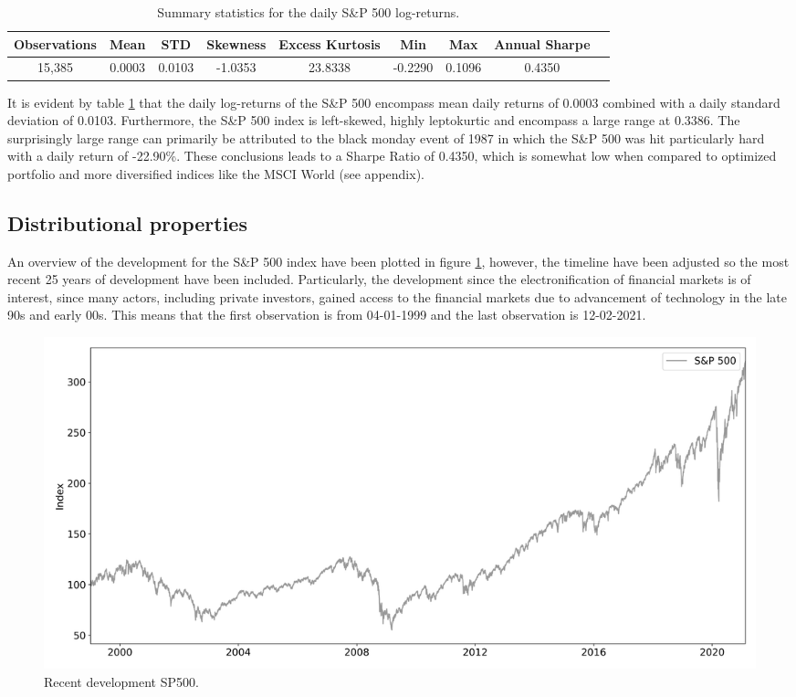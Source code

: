 \begin{table}[H]
\small
\caption{Summary statistics for the daily S\&P 500 log-returns.}
\centering
\begin{tabular}{c c c c c c c c c} 
\hline\hline
Observations & Mean & STD & Skewness & Excess Kurtosis & Min & Max & Annual Sharpe \\
\hline
15,385 & 0.0003 & 0.0103 & -1.0353 & 23.8338 & -0.2290 & 0.1096 & 0.4350 \\
\hline
\end{tabular}
\label{tab:summary_stats_S&P500}
\end{table}
 
It is evident by table \ref{tab:summary_stats_S&P500} that the daily log-returns of the S\&P 500 encompass mean daily returns of 0.0003 combined with a daily standard deviation of 0.0103. Furthermore, the S\&P 500 index is left-skewed, highly leptokurtic and encompass a large range at 0.3386. The surprisingly large range can primarily be attributed to the black monday event of 1987 in which the S\&P 500 was hit particularly hard with a daily return of -22.90\%. These conclusions leads to a Sharpe Ratio of 0.4350, which is somewhat low when compared to optimized portfolio and more diversified indices like the MSCI World (see appendix).

\subsection{Distributional properties} An overview of the development for the S\&P 500 index have been plotted in figure \ref{fig: all_indices_index}, however, the timeline have been adjusted so the most recent 25 years of development have been included. Particularly, the development since the electronification of financial markets is of interest, since many actors, including private investors, gained access to the financial markets due to advancement of technology in the late 90s and early 00s. This means that the first observation is from 04-01-1999 and the last observation is 12-02-2021. 
\begin{figure}[H] 
    \centering
    \includegraphics[width=1.0\textwidth]{analysis/data_description/images/adjusted SP500.png}
    \caption{Recent development SP500.}
    \label{fig: all_indices_index} 
\end{figure}

